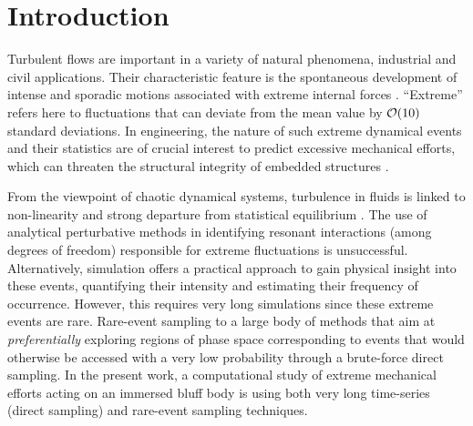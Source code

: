 \section{Introduction}

%
Turbulent flows are important in a variety of natural phenomena, industrial and civil applications.
Their characteristic feature is the spontaneous development of intense and sporadic motions associated with extreme internal forces \citep{lesieur_book,donzis_sreenivasan_2010,Yeung}.
``Extreme'' refers here to fluctuations that can deviate from the mean value by ${\cal{O}}(10)$ standard deviations.
In engineering, the nature of such extreme dynamical events and their statistics are of crucial interest to predict excessive mechanical efforts, which can threaten the structural integrity of embedded structures .
%

From the viewpoint of chaotic dynamical systems, turbulence in fluids is linked to non-linearity and strong departure from statistical equilibrium \citep{KRAICHNAN}.
The use of analytical perturbative methods in identifying resonant interactions (among degrees of freedom) responsible for extreme fluctuations is unsuccessful.
Alternatively, simulation offers a practical approach to gain physical insight into these events, quantifying their intensity and estimating their frequency of occurrence.
However, this requires very long simulations since these extreme events are rare. 
%
%
{Rare-event sampling  to a large body of methods that aim at \emph{preferentially} exploring  regions of phase space corresponding to  events that would otherwise be accessed with a very low probability through a brute-force direct sampling.}
%
%	
%
In the present work, a computational study of extreme mechanical efforts acting on an immersed bluff body is  using both very long time-series (direct sampling) and rare-event sampling techniques.



